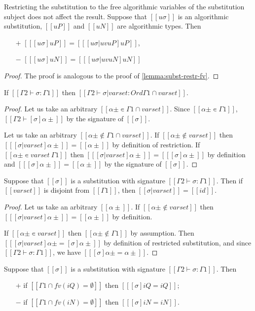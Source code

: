 \begin{lemma}
  \label{lemma:subst-restr-uv}
  Restricting the substitution to the free algorithmic 
  variables of the
  substitution subject does not affect the result.
  Suppose that $[[uσ]]$ is an algorithmic substitution,
  $[[uP]]$ and $[[uN]]$ are algorithmic types. Then
 \begin{itemize}
    \item[$+$] $[[ [uσ]uP ]] = [[ [uσ|uv uP]uP ]]$,
    \item[$-$] $[[ [uσ]uN ]] = [[ [uσ|uv uN]uN ]]$
  \end{itemize}
\end{lemma}
\begin{proof}
  The proof is analogous to the proof of \cref{lemma:subst-restr-fv}.
\end{proof}

\begin{lemma}
  \label{lemma:subst-restr-sig}
  If $[[Γ2 ⊢ σ : Γ1]]$ then $[[Γ2 ⊢ σ|varset : Ord {Γ1} ∩ varset]]$.
\end{lemma}
\begin{proof}
  Let us take an arbitrary $[[α± ∊ {Γ1} ∩ varset]]$.
  Since $[[α± ∊ {Γ1}]]$, $[[Γ2 ⊢ [σ]α± ]]$ by the signature of $[[σ]]$.

  Let us take an arbitrary $[[α± ∉ {Γ1} ∩ varset]]$.
  If $[[α± ∉ varset]]$ then $[[ [σ|varset]α± ]] = [[α±]]$ by definition
  of restriction. 
  If $[[α± ∊ varset \ {Γ1}]]$ then $[[ [σ|varset]α± ]] = [[ [σ]α± ]]$ by definition
  and $[[ [σ]α± ]] = [[α±]]$ by the signature of $[[σ]]$.
\end{proof}

\begin{lemma}
  Suppose that $[[σ]]$ is a substitution with signature $[[Γ2 ⊢ σ : Γ1]]$. 
  Then if $[[varset]]$ is disjoint from $[[Γ1]]$, 
  then $[[ σ|varset]] = [[ id ]]$. 
\end{lemma}
\begin{proof}
  Let us take an arbitrary $[[α±]]$.
  If $[[α± ∉ varset]]$ then $[[ [σ|varset]α±]] = [[α±]]$ by definition.

  If $[[α± ∊ varset]]$ then $[[α± ∉ {Γ1}]]$ by assumption.
  Then $[[ [σ|varset]α± = [σ]α±]]$ by definition of restricted substitution, and
  since $[[Γ2 ⊢ σ : Γ1]]$, we have $[[ [σ]α± = α± ]]$.
\end{proof}

\begin{corollary}
  \label{corollary:subst-disj}
  Suppose that $[[σ]]$ is a substitution with signature $[[Γ2 ⊢ σ : Γ1]]$. Then
  \begin{itemize}
    \item [$+$] if $[[{Γ1} ∩ fv(iQ) = ∅]]$ then $[[ [σ] iQ = iQ]]$;
    \item [$-$] if $[[{Γ1} ∩ fv(iN) = ∅]]$ then $[[ [σ] iN = iN]]$.
  \end{itemize}
\end{corollary}

